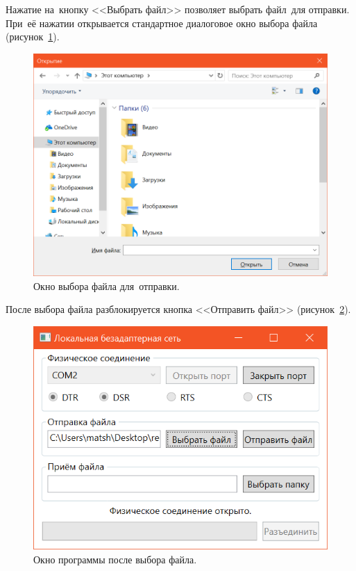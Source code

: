 \documentclass[a4paper,12pt]{article}
\begin{document}
Нажатие на~кнопку <<Выбрать файл>> позволяет выбрать файл~для отправки. При~её нажатии открывается стандартное диалоговое окно выбора файла (рисунок~\ref{file}).
\begin{figure}
\centering
\includegraphics[width=\linewidth]{file.png}
\caption{Окно выбора файла для~отправки.}\label{file}
\end{figure}
После выбора файла разблокируется кнопка <<Отправить файл>> (рисунок~\ref{send}).
\begin{figure}
\centering
\includegraphics{send.png}
\caption{Окно программы после выбора файла.}\label{send}
\end{figure}
\end{document}
